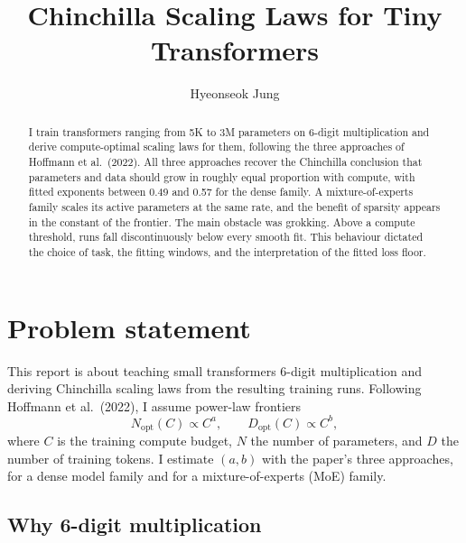\documentclass[10pt]{article}
\title{Chinchilla Scaling Laws for Tiny Transformers}
\author{Hyeonseok Jung}
\date{}
\newcommand{\Nopt}{N_{\mathrm{opt}}}
\newcommand{\Dopt}{D_{\mathrm{opt}}}
\begin{document}
\maketitle

\begin{abstract}
I train transformers ranging from 5K to 3M parameters on 6-digit
multiplication and derive compute-optimal scaling laws for them, following
the three approaches of Hoffmann et al.\ (2022). All three approaches
recover the Chinchilla conclusion that parameters and data should grow in
roughly equal proportion with compute, with fitted exponents between 0.49
and 0.57 for the dense family. A mixture-of-experts family scales its
active parameters at the same rate, and the benefit of sparsity appears in
the constant of the frontier. The main obstacle was grokking. Above a
compute threshold, runs fall discontinuously below every smooth fit. This
behaviour dictated the choice of task, the fitting windows, and the
interpretation of the fitted loss floor.
\end{abstract}

\section{Problem statement}

This report is about teaching small transformers 6-digit multiplication and
deriving Chinchilla scaling laws from the resulting training runs. Following
Hoffmann et al.\ (2022), I assume power-law frontiers
\begin{equation}
  \Nopt(C) \propto C^{a}, \qquad \Dopt(C) \propto C^{b},
\end{equation}
where $C$ is the training compute budget, $N$ the number of parameters, and
$D$ the number of training tokens. I estimate $(a, b)$ with the paper's
three approaches, for a dense model family and for a mixture-of-experts
(MoE) family.

\subsection{Why 6-digit multiplication}
\end{document}
